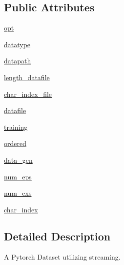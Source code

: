 \subsection*{Public Attributes}
\begin{DoxyCompactItemize}
\item 
\hyperlink{classparlai_1_1core_1_1pytorch__data__teacher_1_1StreamDataset_a131f7e729877877d35c4f5f74263e0d0}{opt}
\item 
\hyperlink{classparlai_1_1core_1_1pytorch__data__teacher_1_1StreamDataset_a872e514e289be401a00ad8a1c358773c}{datatype}
\item 
\hyperlink{classparlai_1_1core_1_1pytorch__data__teacher_1_1StreamDataset_a27ea8f73accd10ffa845ba3b3a4c189e}{datapath}
\item 
\hyperlink{classparlai_1_1core_1_1pytorch__data__teacher_1_1StreamDataset_a21044955b22bbbe21fe4ef5aca8a7ef8}{length\+\_\+datafile}
\item 
\hyperlink{classparlai_1_1core_1_1pytorch__data__teacher_1_1StreamDataset_a416c312503de875692bd9fc2b47198d4}{char\+\_\+index\+\_\+file}
\item 
\hyperlink{classparlai_1_1core_1_1pytorch__data__teacher_1_1StreamDataset_a0caa1c3c9e2d01221cc59a224ecdc107}{datafile}
\item 
\hyperlink{classparlai_1_1core_1_1pytorch__data__teacher_1_1StreamDataset_a57104c9e186b0a6d78e6d0ac4c0ab1db}{training}
\item 
\hyperlink{classparlai_1_1core_1_1pytorch__data__teacher_1_1StreamDataset_affabf282bb6e556bfc5b3d8402924b8b}{ordered}
\item 
\hyperlink{classparlai_1_1core_1_1pytorch__data__teacher_1_1StreamDataset_abb69b7392b29a63835bfd475a78553f1}{data\+\_\+gen}
\item 
\hyperlink{classparlai_1_1core_1_1pytorch__data__teacher_1_1StreamDataset_ae9315b97e4ba810e58fe1ccfedd38b98}{num\+\_\+eps}
\item 
\hyperlink{classparlai_1_1core_1_1pytorch__data__teacher_1_1StreamDataset_a2155bdd1c8cd3723c252ea05aa859a8c}{num\+\_\+exs}
\item 
\hyperlink{classparlai_1_1core_1_1pytorch__data__teacher_1_1StreamDataset_a632ed3ae104c8cee00730e9f1f827cc4}{char\+\_\+index}
\end{DoxyCompactItemize}


\subsection{Detailed Description}
\begin{DoxyVerb}A Pytorch Dataset utilizing streaming.\end{DoxyVerb}
 

